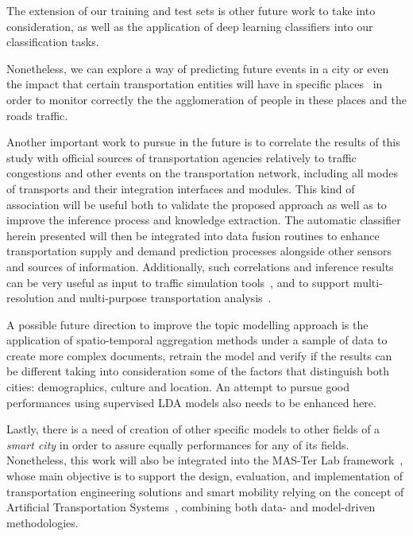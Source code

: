 The extension of our training and test sets is other future work to take into consideration, as well as the application of deep learning classifiers into our classification tasks.

Nonetheless, we can explore a way of predicting future events in a city or even the impact that certain transportation entities will have in specific places~\cite{saleiro2016learning} in order to monitor correctly the the agglomeration of people in these places and the roads traffic.

Another important work to pursue in the future is to correlate the results of this study with official sources of transportation agencies relatively to traffic congestions and other events on the transportation network, including all modes of transports and their integration interfaces and modules. This kind of association will be useful both to validate the proposed approach as well as to improve the inference process and knowledge extraction. The automatic classifier herein presented will then be integrated into data fusion routines to enhance transportation supply and demand prediction processes alongside other sensors and sources of information. Additionally, such correlations and inference results can be very useful as input to traffic simulation tools~\cite{passos2011towards, azevedo2015state}, and to support multi-resolution and multi-purpose transportation analysis~\cite{timoteo2010trasmapi, ferreira2008cooperative}.

A possible future direction to improve the topic modelling approach is the application of spatio-temporal aggregation methods under a sample of data to create more complex documents, retrain the model and verify if the results can be different taking into consideration some of the factors that distinguish both cities: demographics, culture and location. An attempt to pursue good performances using supervised LDA models also needs to be enhanced here.

Lastly, there is a need of creation of other specific models to other fields of a \textit{smart city} in order to assure equally performances for any of its fields. Nonetheless, this work will also be integrated into the MAS-Ter Lab framework~\cite{rossetti2007towards}, whose main objective is to support the design, evaluation, and implementation of transportation engineering solutions and smart mobility relying on the concept of Artificial Transportation Systems~\cite{rossetti2014advances}, combining both data- and model-driven methodologies.